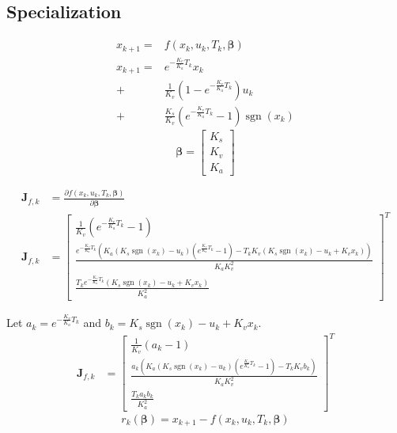 \documentclass[10pt,conference,compsoc]{IEEEtran}
\DeclareMathOperator{\sgn}{sgn}
\newcommand{\mat}[1] {\mathbf{#1}}
\begin{document}
\subsection{Specialization}
\begin{equation*}
  \begin{aligned}
    x_{k+1} =& f(x_k, u_k, T_k, \bm{\beta}) \\
    x_{k+1} =& e^{-\frac{K_v}{K_a} T_k} x_k \\
      +& \frac{1}{K_v}
        \left(1 - e^{-\frac{K_v}{K_a} T_k}\right) u_k \\
      +& \frac{K_s}{K_v}
        \left(e^{-\frac{K_v}{K_a} T_k} - 1\right)\sgn(x_k)
  \end{aligned}
\end{equation*}
\begin{equation*}
  \bm{\beta} = \begin{bmatrix}K_s \\ K_v \\ K_a\end{bmatrix}
\end{equation*}

\begin{align*}
  \mat{J}_{f,k} &= \frac{\partial f(x_k, u_k, T_k, \bm{\beta})}
    {\partial \bm{\beta}} \\
  \mat{J}_{f,k} &=
  \left[
  \begin{smallmatrix}
    \frac{1}{K_v}\left(e^{-\frac{K_v}{K_a} T_k} - 1\right) \\
    \frac{e^{-\frac{K_v}{K_a} T_k} \left(K_a (K_s\sgn(x_k) - u_k)
      \left(e^{\frac{K_v}{K_a} T_k} - 1\right) -
      T_k K_v (K_s\sgn(x_k) - u_k + K_v x_k)\right)}
      {K_a K_v^2} \\
    \frac{T_k e^{-\frac{K_v}{K_a} T_k} (K_s\sgn(x_k) - u_k + K_v x_k)}{K_a^2}
  \end{smallmatrix}
  \right]^T
\end{align*}

Let $a_k = e^{-\frac{K_v}{K_a} T_k}$ and $b_k = K_s\sgn(x_k) - u_k + K_v x_k$.
\begin{align*}
  \mat{J}_{f,k} &=
  \begin{bmatrix}
    \frac{1}{K_v}\left(a_k - 1\right) \\
    \frac{a_k \left(K_a (K_s\sgn(x_k) - u_k)\left(e^{\frac{K_v}{K_a} T_k} - 1\right) -
      T_k K_v b_k\right)}{K_a K_v^2} \\
    \frac{T_k a_k b_k}{K_a^2}
  \end{bmatrix}^T
\end{align*}
\begin{equation*}
  r_k(\bm{\beta}) = x_{k+1} - f(x_k, u_k, T_k, \bm{\beta})
\end{equation*}
\end{document}
